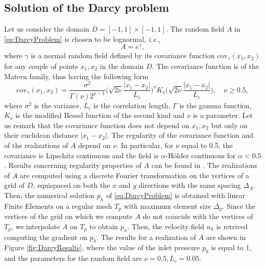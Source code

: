 \subsection{Solution of the Darcy problem}

Let us consider the domain $D = [-1,1] \times [-1,1]$. The random field $A$ in \eqref{eq:DarcyProblem} is chosen to be lognormal, \textit{i.e.}, 
\begin{equation}\label{eq:RandomField}
	A = e^\gamma,
\end{equation}
where $\gamma$ is a normal random field defined by its covariance function $\mathrm{cov}_\gamma(x_1,x_2)$ for any couple of points $x_1,x_2$ in the domain $D$. The covariance function is of the Matern family, thus having the following form
\begin{equation}\label{eq:CovFunction}
	\mathrm{cov}_\gamma(x_1,x_2) = \frac{\sigma^2}{\Gamma(\nu)2^{\nu-1}}\Big(\sqrt{2\nu}\frac{|x_1-x_2|}{L_c}\Big)^\nu K_{\nu}\Big(\sqrt{2\nu}\frac{|x_1-x_2|}{L_c}\Big), \quad \nu \geq 0.5,
\end{equation}
where $\sigma^2$ is the variance, $L_c$ is the correlation length, $\Gamma$ is the gamma function, $K_\nu$ is the modified Bessel function of the second kind and $\nu$ is a parameter. Let us remark that the covariance function does not depend on $x_1, x_2$ but only on their euclidean distance $|x_1 - x_2|$. The regularity of the covariance function and of the realizations of $A$ depend on $\nu$. In particular, for $\nu$ equal to 0.5, the covariance is Lipschitz continuous and the field is $\alpha$-Hölder continuous for $\alpha < 0.5$. Results concerning regularity properties of $A$ can be found in \cite{Nobile2015}. The realizations of $A$ are computed using a discrete Fourier transformation on the vertices of a grid of $D$, equispaced on both the $x$ and $y$ directions with the same spacing $\Delta_A$. Then, the numerical solution $p_h$ of \eqref{eq:DarcyProblem} is obtained with linear Finite Elements on a regular mesh $T_p$ with maximum element size $\Delta_p$. Since the vertices of the grid on which we compute $A$ do not coincide with the vertices of $T_p$, we interpolate $A$ on $T_p$ to obtain $p_h$. Then, the velocity field $u_h$ is retrived computing the gradient on $p_h$. The results for a realization of $A$ are shown in Figure \ref{fig:DarcyResults}, where the value of the inlet pressure $p_0$ is equal to 1, and the parameters for the random field are $\nu = 0.5, L_c = 0.05$. 

